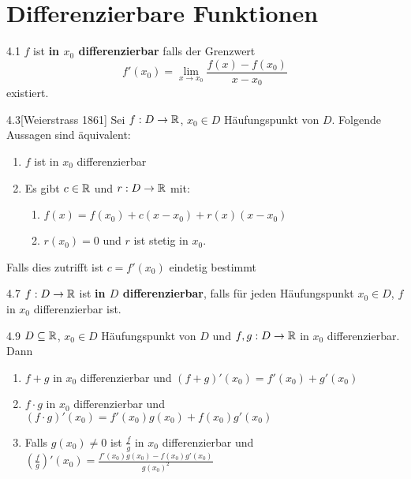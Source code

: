 \section{Differenzierbare Funktionen}

\begin{definition}{4.1}
    $f$ ist \textbf{in $x_0$ differenzierbar} falls der Grenzwert
    \[ f'(x_0) = \lim_{x \to x_0} \frac{f(x) - f(x_0)}{x - x_0} \]
    existiert.
\end{definition}

\begin{satz}{4.3}[Weierstrass 1861]
    Sei $f: D \to \mathbb{R}$, $x_0 \in D$ Häufungspunkt von $D$. Folgende Aussagen sind äquivalent:
    \begin{enumerate}
        \item $f$ ist in $x_0$ differenzierbar
        \item Es gibt $c \in \mathbb{R}$ und $r: D \to \mathbb{R}$ mit:
              \begin{enumerate}
                  \item $f(x) = f(x_0) + c(x - x_0) + r(x)(x - x_0)$
                  \item $r(x_0) = 0$ und $r$ ist stetig in $x_0$.
              \end{enumerate}
    \end{enumerate}

    Falls dies zutrifft ist $c = f'(x_0)$ eindetig bestimmt
\end{satz}

\begin{satz}{4.7}
    $f: D \to \mathbb{R}$ ist \textbf{in $D$ differenzierbar}, falls für jeden Häufungspunkt $x_0 \in D$, $f$ in $x_0$ differenzierbar ist.
\end{satz}

\begin{satz}{4.9}
    $D \subseteq \mathbb{R}$, $x_0 \in D$ Häufungspunkt von $D$ und $f,g: D \to \mathbb{R}$ in $x_0$ differenzierbar.
    Dann
    \begin{enumerate}
        \item $f+g$ in $x_0$ differenzierbar und $(f + g)'(x_0) = f'(x_0) + g'(x_0)$
        \item $f \cdot g$ in $x_0$ differenzierbar und $(f \cdot g)'(x_0) = f'(x_0)g(x_0) + f(x_0)g'(x_0)$
        \item Falls $g(x_0) \ne 0$ ist $\frac{f}{g}$ in $x_0$ differenzierbar und
              $\left( \frac{f}{g} \right)'(x_0) = \frac{f'(x_0)g(x_0) - f(x_0)g'(x_0)}{g(x_0)^2}$
    \end{enumerate}
\end{satz}

